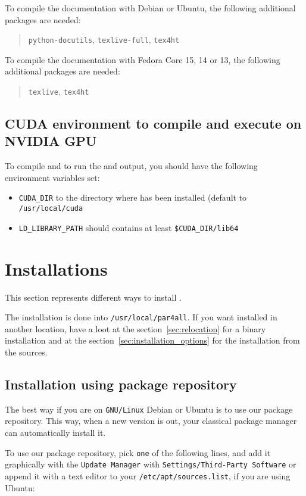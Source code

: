 \documentclass[a4paper]{article}
\begin{document}
To compile the documentation with Debian or Ubuntu, the following
additional packages are needed:
\begin{quote}
  \texttt{python-docutils}, \texttt{texlive-full}, \texttt{tex4ht}
\end{quote}

To compile the documentation with Fedora Core 15, 14 or 13, the following
additional packages are needed:
\begin{quote}
  \texttt{texlive}, \texttt{tex4ht}
\end{quote}


\subsection{CUDA environment to compile and execute on NVIDIA GPU}

To compile and to run the \Acuda and \Aopencl output, you should have the following
environment variables set:
\begin{itemize}
\item \verb|CUDA_DIR| to the directory where \Acuda has been installed (default to
  \texttt{/usr/local/cuda}
\item \verb|LD_LIBRARY_PATH| should contains at least \verb|$CUDA_DIR/lib64|
\end{itemize}


\section{Installations}
\label{sec:installation}

This section represents different ways to install \Apfa.

The installation is done into \texttt{/usr/local/par4all}. If you want
\Apfa installed in another location, have a loot at the
section~\ref{sec:relocation} for a binary installation and at the
section~\ref{sec:installation_options} for the installation from the
sources.


\subsection{Installation using \protect\Apfa package repository}

The best way if you are on \texttt{GNU/Linux} Debian or Ubuntu is to use
our package repository. This way, when a new version is out, your
classical package manager can automatically install it.

To use our package repository, pick \texttt{one} of the following lines, and
add it graphically with the \texttt{Update Manager} with
\texttt{Settings/Third-Party Software} or append it with a text editor to
your \texttt{/etc/apt/sources.list}, if you are using Ubuntu:
\end{document}
